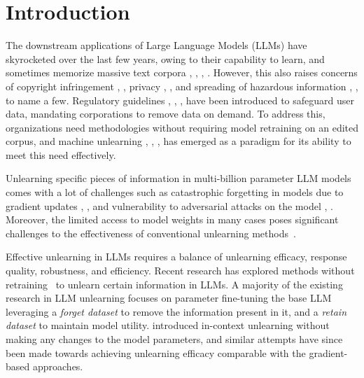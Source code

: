 \section{Introduction}
The downstream applications of Large Language Models (LLMs) have skyrocketed over the last few years, owing to their capability to learn, and sometimes memorize massive text corpora \cite{grattafiori2024llama3herdmodels}, \cite{qwen2.5}, \cite{achiam2023gpt}, \cite{geminiteam2024gemini15unlockingmultimodal}. However, this also raises concerns of copyright infringement \cite{karamolegkou2023copyrightviolationslargelanguage}, \cite{henderson2023foundationmodelsfairuse}, privacy \cite{staab2024memorizationviolatingprivacyinference}, \cite{ippolito2023preventingverbatimmemorizationlanguage}, and spreading of hazardous information \cite{li2024wmdpbenchmarkmeasuringreducing}, \cite{harandizadeh2024riskresponselargelanguage}, \cite{fang2024llmagentsautonomouslyhack} to name a few. Regulatory guidelines \cite{digital2023dpdpa},
\cite{oag2021ccpa}, \cite{european2016gdpr}, have been introduced to safeguard user data, mandating corporations to remove data on demand. To address this, organizations need methodologies without requiring model retraining on an edited corpus, and machine unlearning \cite{Xu_2024}, \cite{Chundawat_2023}, \cite{Tarun_2024}, \cite{chundawat2023badteachinginduceforgetting} has emerged as a paradigm for its ability to meet this need effectively.\par

Unlearning specific pieces of information in multi-billion parameter LLM models comes with a lot of challenges such as catastrophic forgetting in models due to gradient updates \cite{aghajanyan2020betterfinetuningreducingrepresentational}, \cite{zhang2024negativepreferenceoptimizationcatastrophic}, \cite{gu2024modeleditingharmsgeneral} and vulnerability to adversarial attacks on the model \cite{anil2024many}, \cite{schwinn2024soft}. Moreover, the limited access to model weights in many cases poses significant challenges to the effectiveness of conventional unlearning methods~\cite{neel2020descenttodeletegradientbasedmethodsmachine}.

Effective unlearning in LLMs requires a balance of unlearning efficacy, response quality, robustness, and efficiency. Recent research has explored methods without retraining~\cite{achiam2023gpt,jang2022knowledge} to unlearn certain information in LLMs. A majority of the existing research in LLM unlearning focuses on parameter fine-tuning the base LLM \cite{wang2023kgageneralmachineunlearning,li2024wmdpbenchmarkmeasuringreducing,eldan2023whosharrypotterapproximate,liu2024revisitingwhosharrypotter,jia2024soul} leveraging a \emph{forget dataset} to remove the information present in it, and a \emph{retain dataset} to maintain model utility. \cite{pawelczyk2023context} introduced in-context unlearning without making any changes to the model parameters, and similar attempts \cite{thaker2024guardrail} have since been made towards achieving unlearning efficacy comparable with the gradient-based approaches.\par

